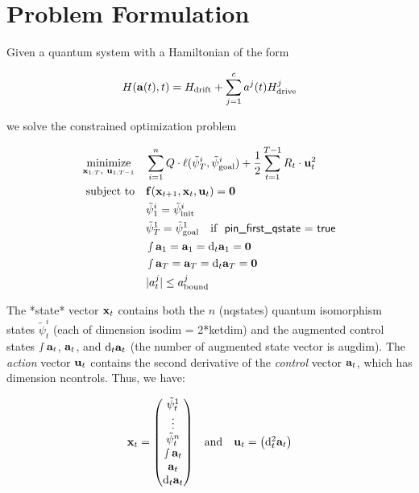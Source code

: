 \documentclass{article}
\newcommand{\isopsi}{\tilde \psi}
\begin{document}
\section{Problem Formulation}

Given a quantum system with a Hamiltonian of the form

$$
H(\vb{{a}}(t), t ) = H_{\text{drift}} + \sum_{j=1}^c a^j(t) H_{\text{drive}}^j
$$

we solve the constrained optimization problem

\begin{align*}
  \underset{\vb{x}_{1:T}, \ \vb{u}_{1:T-1}}{\text{minimize}} \quad
    & \sum_{i=1}^n Q \cdot \ell(\isopsi_T^i, \isopsi_\text{goal}^i) + \frac{1}{2} \sum_{t=1}^{T-1} R_t \cdot \vb{u}_t^2 \\ 
  \text{subject to} \quad 
    & \vb{f}(\vb{x}_{t+1}, \vb{x}_t, \vb{u}_t) = \vb{0}  \\
    &  \isopsi^i_1 = \isopsi^i_\text{init} \\
    & \isopsi^1_T = \isopsi^1_\text{goal} \quad \text{if }\ \textsf{pin\_first\_qstate = true}\\
    & \smallint \vb{a}_1 = \vb{a}_1 = \dd_t \vb{a}_1 = \vb{0} \\  
    & \smallint \vb{a}_T = \vb{a}_T = \dd_t \vb{a}_T = \vb{0} \\
    & |a^j_t| \leq a^j_\text{bound} \\
\end{align*}


The *state* vector $\vb{x}_t$ contains both the $n$ (\textsf{nqstates}) quantum isomorphism states $\isopsi^i_t$ (each of dimension \textsf{isodim = 2*ketdim}) and the augmented control states $\smallint \vb{a}_t$, $\vb{a}_t$, and $\dd_t \vb{a}_t$ (the number of augmented state vector is \textsf{augdim}). The \textit{action} vector $\vb{u}_t$ contains the second derivative of the \textit{control} vector $\vb{a}_t$, which has dimension \textsf{ncontrols}. Thus, we have:

\begin{equation}
  \vb{x}_t = \mqty(
    \isopsi^1_t \\ 
    \vdots \\ 
    \isopsi^n_t \\ 
    \smallint \vb{a}_t \\ 
    \vb{a}_t \\ 
    \dd_t \vb{a}_t 
  )
  \quad \text{and} \quad 
  \vb{u}_t = \mqty(
    \dd^2_t \vb{a}_t
  )
\end{equation}
\end{document}
